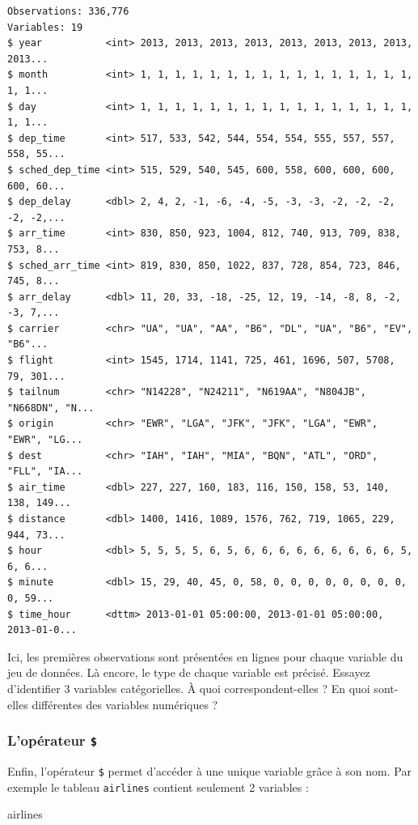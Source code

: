 \documentclass[a4paperpaper,]{article}
\newenvironment{Shaded}{\begin{snugshade}}{\end{snugshade}}
\newcommand{\NormalTok}[1]{\textcolor[rgb]{0.12,0.11,0.11}{#1}}
\theoremstyle{definition}
\theoremstyle{definition}
\theoremstyle{definition}
\theoremstyle{remark}
\begin{document}
\begin{verbatim}
Observations: 336,776
Variables: 19
$ year           <int> 2013, 2013, 2013, 2013, 2013, 2013, 2013, 2013, 2013...
$ month          <int> 1, 1, 1, 1, 1, 1, 1, 1, 1, 1, 1, 1, 1, 1, 1, 1, 1, 1...
$ day            <int> 1, 1, 1, 1, 1, 1, 1, 1, 1, 1, 1, 1, 1, 1, 1, 1, 1, 1...
$ dep_time       <int> 517, 533, 542, 544, 554, 554, 555, 557, 557, 558, 55...
$ sched_dep_time <int> 515, 529, 540, 545, 600, 558, 600, 600, 600, 600, 60...
$ dep_delay      <dbl> 2, 4, 2, -1, -6, -4, -5, -3, -3, -2, -2, -2, -2, -2,...
$ arr_time       <int> 830, 850, 923, 1004, 812, 740, 913, 709, 838, 753, 8...
$ sched_arr_time <int> 819, 830, 850, 1022, 837, 728, 854, 723, 846, 745, 8...
$ arr_delay      <dbl> 11, 20, 33, -18, -25, 12, 19, -14, -8, 8, -2, -3, 7,...
$ carrier        <chr> "UA", "UA", "AA", "B6", "DL", "UA", "B6", "EV", "B6"...
$ flight         <int> 1545, 1714, 1141, 725, 461, 1696, 507, 5708, 79, 301...
$ tailnum        <chr> "N14228", "N24211", "N619AA", "N804JB", "N668DN", "N...
$ origin         <chr> "EWR", "LGA", "JFK", "JFK", "LGA", "EWR", "EWR", "LG...
$ dest           <chr> "IAH", "IAH", "MIA", "BQN", "ATL", "ORD", "FLL", "IA...
$ air_time       <dbl> 227, 227, 160, 183, 116, 150, 158, 53, 140, 138, 149...
$ distance       <dbl> 1400, 1416, 1089, 1576, 762, 719, 1065, 229, 944, 73...
$ hour           <dbl> 5, 5, 5, 5, 6, 5, 6, 6, 6, 6, 6, 6, 6, 6, 6, 5, 6, 6...
$ minute         <dbl> 15, 29, 40, 45, 0, 58, 0, 0, 0, 0, 0, 0, 0, 0, 0, 59...
$ time_hour      <dttm> 2013-01-01 05:00:00, 2013-01-01 05:00:00, 2013-01-0...
\end{verbatim}

Ici, les premières observations sont présentées en lignes pour chaque
variable du jeu de données. Là encore, le type de chaque variable est
précisé. Essayez d'identifier 3 variables catégorielles. À quoi
correspondent-elles ? En quoi sont-elles différentes des variables
numériques ?

\hypertarget{loperateur}{%
\subsubsection{\texorpdfstring{L'opérateur
\texttt{\$}}{L'opérateur \$}}\label{loperateur}}

Enfin, l'opérateur \texttt{\$} permet d'accéder à une unique variable
grâce à son nom. Par exemple le tableau \texttt{airlines} contient
seulement 2 variables :

\begin{Shaded}
\begin{Highlighting}[]
\NormalTok{airlines}
\end{Highlighting}
\end{Shaded}
\end{document}
